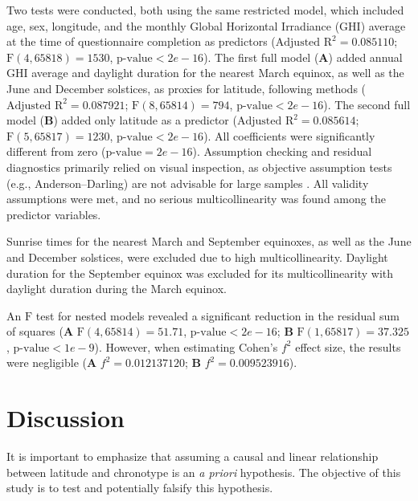 \documentclass[
12pt,
openright,
oneside,
a4paper,
chapter=TITLE,
section=TITLE,
french,
spanish,
brazil,
english
]{abntex2}\usepackage{array}
\begin{document}
Two tests were conducted, both using the same restricted model, which
included age, sex, longitude, and the monthly Global Horizontal
Irradiance (GHI) average at the time of questionnaire completion as
predictors (\(\text{Adjusted R}^{2} = 0.085110\);
\(\text{F}(4, 65818) = 1530\), \(\text{p-value} < 2e-16\)). The first
full model (\textbf{A}) added annual GHI average and daylight duration
for the nearest March equinox, as well as the June and December
solstices, as proxies for latitude, following
\textcite{leocadio-miguel2017} methods
(\(\text{Adjusted R}^{2} = 0.087921\); \(\text{F}(8, 65814) = 794\),
\(\text{p-value} < 2e-16\)). The second full model (\textbf{B}) added
only latitude as a predictor (\(\text{Adjusted R}^{2} = 0.085614\);
\(\text{F}(5, 65817) = 1230\), \(\text{p-value} < 2e-16\)). All
coefficients were significantly different from zero
(\(\text{p-value} = 2e-16\)). Assumption checking and residual
diagnostics primarily relied on visual inspection, as objective
assumption tests (e.g., Anderson--Darling) are not advisable for large
samples \autocite{shatz2024}. All validity assumptions were met, and no
serious multicollinearity was found among the predictor variables.

Sunrise times for the nearest March and September equinoxes, as well as
the June and December solstices, were excluded due to high
multicollinearity. Daylight duration for the September equinox was
excluded for its multicollinearity with daylight duration during the
March equinox.

An \(\text{F}\) test for nested models revealed a significant reduction
in the residual sum of squares (\textbf{A}
\(\text{F}(4, 65814) = 51.71\), \(\text{p-value} < 2e-16\); \textbf{B}
\(\text{F}(1, 65817) = 37.325\), \(\text{p-value} < 1e-9\)). However,
when estimating Cohen's \(f^2\) effect size, the results were negligible
\autocite{cohen1992} (\textbf{A} \(f^{2} = 0.012137120\); \textbf{B}
\(f^{2} = 0.009523916\)).

\section{Discussion}\label{discussion}

It is important to emphasize that assuming a causal and linear
relationship between latitude and chronotype is an \emph{a priori}
hypothesis. The objective of this study is to test and potentially
falsify this hypothesis.
\end{document}
